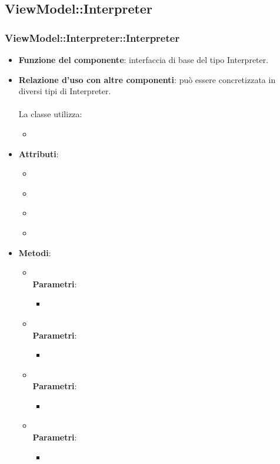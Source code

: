 \subsection{ViewModel::Interpreter}
\subsubsection{ViewModel::Interpreter::Interpreter}
\begin{itemize}
\item\textbf{Funzione del componente}: interfaccia di base del tipo Interpreter.
	\item\textbf{Relazione d'uso con altre componenti}: può essere concretizzata in diversi tipi di Interpreter.\\ \\
La classe utilizza:
	\begin{itemize}
		\item
	\end{itemize}
\item\textbf{Attributi}:
	\begin{itemize}
		\item\code{}\\
		\item\code{}\\
		\item\code{}\\
		\item\code{}\\
	\end{itemize}
\item\textbf{Metodi}:
	\begin{itemize}
		\item\code{}\\
		\textbf{Parametri}:
			\begin{itemize}
				\item\code{}\\
			\end{itemize}
		\item\code{}\\
		\textbf{Parametri}:
			\begin{itemize}
				\item\code{}\\
			\end{itemize}
		\item\code{}\\
		\textbf{Parametri}:
			\begin{itemize}
				\item\code{}\\
			\end{itemize}
		\item\code{}\\
		\textbf{Parametri}:
			\begin{itemize}
				\item\code{}\\
			\end{itemize}
	\end{itemize}
\end{itemize}

